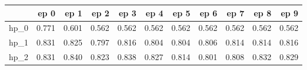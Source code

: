 \begin{tabular}{lrrrrrrrrrr}
\toprule
{} &   ep 0 &   ep 1 &   ep 2 &   ep 3 &   ep 4 &   ep 5 &   ep 6 &   ep 7 &   ep 8 &   ep 9 \\
\midrule
hp\_0 &  0.771 &  0.601 &  0.562 &  0.562 &  0.562 &  0.562 &  0.562 &  0.562 &  0.562 &  0.562 \\
hp\_1 &  0.831 &  0.825 &  0.797 &  0.816 &  0.804 &  0.804 &  0.806 &  0.814 &  0.814 &  0.816 \\
hp\_2 &  0.831 &  0.840 &  0.823 &  0.838 &  0.827 &  0.814 &  0.801 &  0.808 &  0.832 &  0.829 \\
\bottomrule
\end{tabular}
